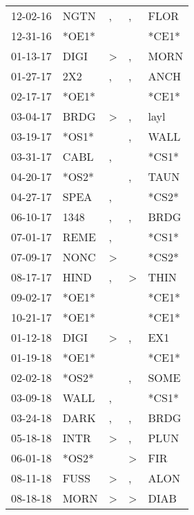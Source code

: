 \begin{supertabular}{lllll}
 12-02-16 &   NGTN &                , &             , &   FLOR \\
 12-31-16 &  *OE1* &                  &               &  *CE1* \\
 01-13-17 &   DIGI &     \textgreater &             , &   MORN \\
 01-27-17 &    2X2 &                , &             , &   ANCH \\
 02-17-17 &  *OE1* &                  &               &  *CE1* \\
 03-04-17 &   BRDG &     \textgreater &             , &   layl \\
 03-19-17 &  *OS1* &                  &             , &   WALL \\
 03-31-17 &   CABL &                , &               &  *CS1* \\
 04-20-17 &  *OS2* &                  &             , &   TAUN \\
 04-27-17 &   SPEA &                , &               &  *CS2* \\
 06-10-17 &   1348 &                , &             , &   BRDG \\
 07-01-17 &   REME &                , &               &  *CS1* \\
 07-09-17 &   NONC &     \textgreater &               &  *CS2* \\
 08-17-17 &   HIND &                , &  \textgreater &   THIN \\
 09-02-17 &  *OE1* &                  &               &  *CE1* \\
 10-21-17 &  *OE1* &                  &               &  *CE1* \\
 01-12-18 &   DIGI &     \textgreater &             , &    EX1 \\
 01-19-18 &  *OE1* &                  &               &  *CE1* \\
 02-02-18 &  *OS2* &                  &             , &   SOME \\
 03-09-18 &   WALL &                , &               &  *CS1* \\
 03-24-18 &   DARK &                , &             , &   BRDG \\
 05-18-18 &   INTR &     \textgreater &             , &   PLUN \\
 06-01-18 &  *OS2* &                  &  \textgreater &    FIR \\
 08-11-18 &   FUSS &     \textgreater &             , &   ALON \\
 08-18-18 &   MORN &     \textgreater &  \textgreater &   DIAB \\

\end{supertabular}
